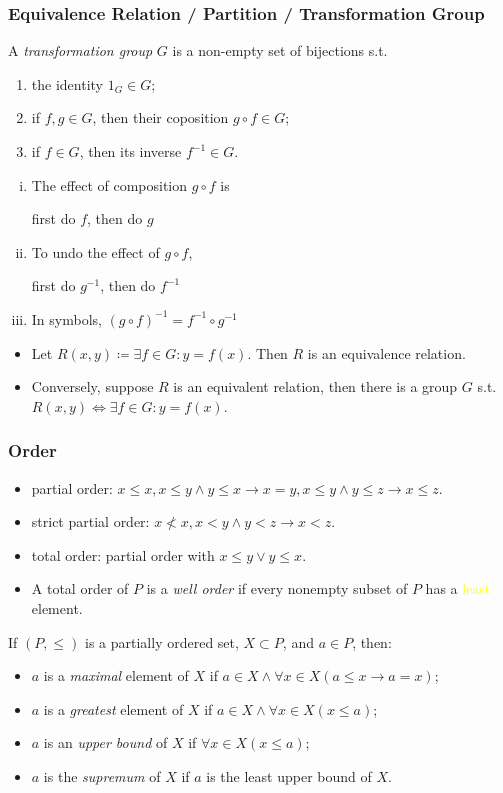 \documentclass[UTF8,11pt,colorlinks,compress,openany]{beamer}%
\begin{document}
\begin{frame}\frametitle{Equivalence Relation / Partition / Transformation Group}
\begin{definition}
A \emph{transformation group} $G$ is a non-empty set of bijections s.t.
\begin{enumerate}
	\item the identity $1_G\in G$;
	\item if $f,g\in G$, then their coposition $g\circ f\in G$;
	\item if $f\in G$, then its inverse $f^{-1}\in G$.
\end{enumerate}
\end{definition}
\begin{enumerate}[i.]
	\item The effect of composition $g\circ f$ is\\
	\centerline{first do $f$, then do $g$}
	\item To undo the effect of $g\circ f$,\\
	\centerline{first do $g^{-1}$, then do $f^{-1}$}
	\item In symbols, $(g\circ f)^{-1}=f^{-1}\circ g^{-1}$
\end{enumerate}
\begin{itemize}
	\item Let $R(x,y)\coloneqq \exists f\in G: y=f(x)$. Then $R$ is an equivalence relation.
	\item Conversely, suppose $R$ is an equivalent relation, then there is a group $G$ s.t. $R(x,y)\iff \exists f\in G: y=f(x)$.
\end{itemize}
\end{frame}

\begin{frame}\frametitle{Order}
	\begin{itemize}
		\item partial order: $x\leq x, x\leq y\wedge y\leq x\to x=y, x\leq y\wedge y\leq z\to x\leq z$.
		\item strict partial order: $x\not< x, x< y\wedge y<z\to x<z$.
		\item total order: partial order with $x\leq y\vee y\leq x$.
		\item A total order of $P$ is a \emph{well order} if every nonempty subset of $P$ has a \textcolor{yellow}{least} element.
	\end{itemize}
	\begin{definition}
		If $(P,\leq)$ is a partially ordered set, $X\subset P$, and $a\in P$, then:
		\begin{itemize}
			\item $a$ is a \emph{maximal} element of $X$ if $a\in X\wedge\forall x\in X(a\leq x\to a=x)$;
			\item $a$ is a \emph{greatest} element of $X$ if $a\in X\wedge\forall x\in X(x\leq a)$;
			\item $a$ is an \emph{upper bound} of $X$ if $\forall x\in X(x\leq a)$;
			\item $a$ is the \emph{supremum} of $X$ if $a$ is the least upper bound of $X$.
		\end{itemize}
	\end{definition}
\end{frame}
\end{document}
